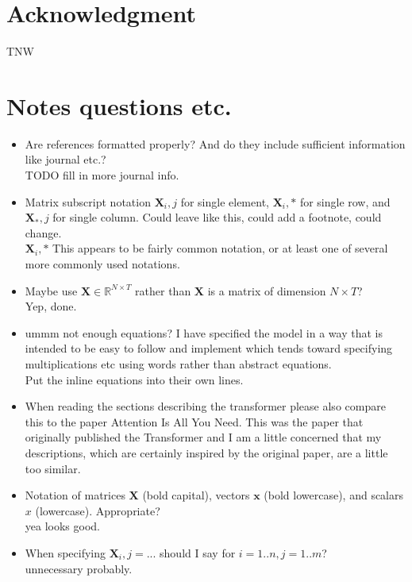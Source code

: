 \documentclass[conference]{IEEEtran}
\begin{document}
\section*{Acknowledgment}
TNW





\section{Notes questions etc.} 
\begin{itemize}
	\item Are references formatted properly? And do they include sufficient information like journal etc.? \\
	TODO fill in more journal info.
	\item Matrix subscript notation $\boldsymbol{X}_i,j$ for single element, $\boldsymbol{X}_i,*$ for single row, and $\boldsymbol{X}_*,j$ for single column. Could leave like this, could add a footnote, could change. \\
	$\boldsymbol{X}_i,*$ This appears to be fairly common notation, or at least one of several more commonly used notations.
	\item Maybe use $\boldsymbol{X} \in \mathbb{R}^{N \times T}$ rather than $\boldsymbol{X}$ is a matrix of dimension $N \times T$? \\
	Yep, done.
	\item ummm not enough equations? I have specified the model in a way that is intended to be easy to follow and implement which tends toward specifying multiplications etc using words rather than abstract equations.\\
	Put the inline equations into their own lines.
	\item When reading the sections describing the transformer please also compare this to the paper Attention Is All You Need. This was the paper that originally published the Transformer and I am a little concerned that my descriptions, which are certainly inspired by the original paper, are a little too similar.
	\item Notation of matrices $\boldsymbol{X}$ (bold capital), vectors $\boldsymbol{x}$ (bold lowercase), and scalars $x$ (lowercase). Appropriate? \\
	yea looks good.
	\item When specifying $\boldsymbol{X}_i,j = ...$ should I say for $i= 1..n, j= 1..m$? \\
	unnecessary probably.
\end{itemize}
\end{document}
